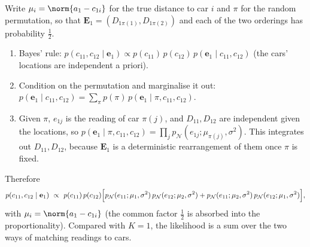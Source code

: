 \begin{solution}
Write $\mu_i=\norm{a_1-c_{1i}}$ for the true distance to car $i$ and $\pi$ for the random permutation, so that
$\mathbf E_1=(D_{1\pi(1)},D_{1\pi(2)})$ and each of the two orderings has probability $\tfrac12$.
\begin{enumerate}[nosep]
  \item Bayes' rule: $p(c_{11},c_{12}\mid\mathbf e_1)\propto p(c_{11})\,p(c_{12})\,p(\mathbf e_1\mid c_{11},c_{12})$
        (the cars' locations are independent a priori).
  \item Condition on the permutation and marginalise it out:
        $p(\mathbf e_1\mid c_{11},c_{12})=\sum_{\pi}p(\pi)\,p(\mathbf e_1\mid\pi,c_{11},c_{12})$.
  \item Given $\pi$, $e_{1j}$ is the reading of car $\pi(j)$, and $D_{11},D_{12}$ are independent given the locations, so
        $p(\mathbf e_1\mid\pi,c_{11},c_{12})=\prod_j p_{\mathcal N}(e_{1j};\mu_{\pi(j)},\sigma^2)$. This integrates out
        $D_{11},D_{12}$, because $\mathbf E_1$ is a deterministic rearrangement of them once $\pi$ is fixed.
\end{enumerate}
Therefore
\[
p(c_{11},c_{12}\mid\mathbf e_1)\ \propto\ p(c_{11})\,p(c_{12})\Bigl[
p_{\mathcal N}(e_{11};\mu_1,\sigma^2)\,p_{\mathcal N}(e_{12};\mu_2,\sigma^2)
+p_{\mathcal N}(e_{11};\mu_2,\sigma^2)\,p_{\mathcal N}(e_{12};\mu_1,\sigma^2)\Bigr],
\]
with $\mu_i=\norm{a_1-c_{1i}}$ (the common factor $\tfrac12$ is absorbed into the proportionality). Compared with
$K=1$, the likelihood is a sum over the two ways of matching readings to cars.
\end{solution}

